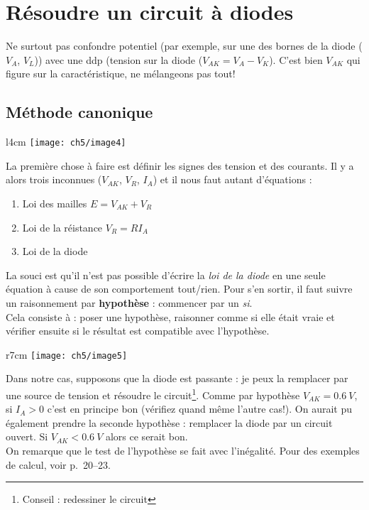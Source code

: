 		
	\section{Résoudre un circuit à diodes}
	\danger Ne surtout pas confondre potentiel (par exemple, sur une des bornes de 
	la diode ($V_A$, $V_L$)) avec une ddp (tension sur la diode ($V_{AK}=V_A-V_K$). 
	C'est bien $V_{AK}$ qui figure sur la caractéristique, ne mélangeons pas tout!
	
		\subsection{Méthode canonique}
			\begin{wrapfigure}[7]{l}{4cm}
	\vspace{-0.5cm}
	\texttt{[image: ch5/image4]}
	\end{wrapfigure}
		La première chose à faire est définir les signes des tension et des courants. 
		Il y a alors trois inconnues ($V_{AK}$, $V_R$, $I_A$) et il nous faut autant 
		d'équations :
		\begin{enumerate}
		\item Loi des mailles $E = V_{AK}+V_R$
		\item Loi de la réistance $V_R=RI_A$
		\item Loi de la diode
		\end{enumerate}
		La souci est qu'il n'est pas possible d'écrire la \textit{loi de la diode} 
		en une seule équation à cause de son comportement tout/rien. Pour s'en 
		sortir, il faut suivre un raisonnement par \textbf{hypothèse} : commencer 
		par un \textit{si}.\\
		Cela consiste à : poser une hypothèse, raisonner comme si elle était vraie 
		et vérifier ensuite si le résultat est compatible avec l'hypothèse.
		
		\newpage
		\begin{wrapfigure}[10]{r}{7cm}
	\texttt{[image: ch5/image5]}
	\end{wrapfigure}
		Dans notre cas, supposons que la diode est passante : je peux la remplacer 
		par une source de tension et résoudre le circuit\footnote{Conseil : redessiner 
		le circuit}. Comme par hypothèse $V_{AK}=0.6\ V$, si $I_A>0$ c'est en principe 
		bon (vérifiez quand même l'autre cas!). On aurait pu également prendre la 
		seconde hypothèse : remplacer la diode par un circuit ouvert. Si $V_{AK}<0.6\ V$
		alors ce serait bon.\\
		On remarque que le test de l'hypothèse se fait avec l’inégalité. Pour des 
		exemples de calcul, voir p.~20--23.\\
		
